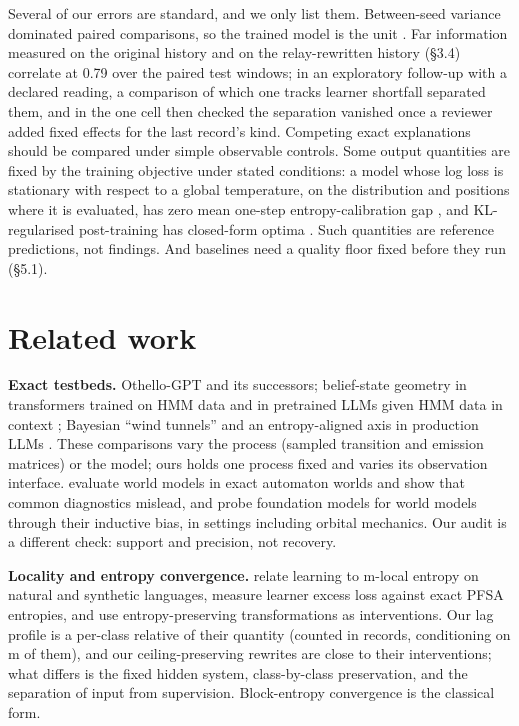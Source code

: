 \documentclass[10pt]{article}
\begin{document}
Several of our errors are standard, and we only list them. Between-seed variance dominated paired comparisons, so the
trained model is the unit \citep{bouthillier2021variance, henderson2017matters}. Far information measured on the original
history and on the relay-rewritten history (§3.4) correlate at 0.79 over the paired test windows; in an exploratory
follow-up with a declared reading, a comparison of which one tracks learner shortfall separated them, and in the one cell
then checked the separation vanished once a reviewer added fixed effects for the last record's kind. Competing exact
explanations should be compared under simple observable controls. Some output quantities are fixed by the training
objective under stated conditions: a model whose log loss is stationary with respect to a global temperature, on the
distribution and positions where it is evaluated, has zero mean one-step entropy-calibration gap
\citep{braverman2019calibration}, and KL-regularised post-training has closed-form optima \citep{rafailov2023dpo}. Such quantities
are reference predictions, not findings. And baselines need a quality floor fixed before they run (§5.1).

\hypertarget{related-work}{%
\section{Related work}\label{related-work}}

\textbf{Exact testbeds.} Othello-GPT \citep{li2022emergent} and its successors; belief-state geometry in transformers trained on
HMM data \citep{shai2024belief} and in pretrained LLMs given HMM data in context \citep{balcells2026belief}; Bayesian ``wind
tunnels'' \citep{agarwal2025bayesian} and an entropy-aligned axis in production LLMs \citep{agarwal2025scaling}. These comparisons
vary the process (sampled transition and emission matrices) or the model; ours holds one process fixed and varies its
observation interface. \citet{vafa2024world} evaluate world models in exact automaton worlds and show that common diagnostics
mislead, and \citet{vafa2025found} probe foundation models for world models through their inductive bias, in settings
including orbital mechanics. Our audit is a different check: support and precision, not recovery.

\textbf{Locality and entropy convergence.} \citet{someya2025locality} relate learning to m-local entropy on natural and synthetic
languages, measure learner excess loss against exact PFSA entropies, and use entropy-preserving transformations as
interventions. Our lag profile is a per-class relative of their quantity (counted in records, conditioning on m of
them), and our ceiling-preserving rewrites are close to their interventions; what differs is the fixed hidden system,
class-by-class preservation, and the separation of input from supervision. Block-entropy convergence
\citep{crutchfield2003regularities} is the classical form.
\end{document}
